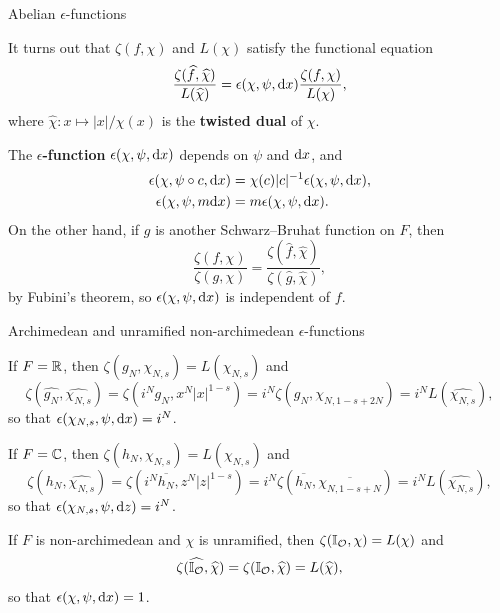 \begin{frame}{Abelian $ \epsilon $-functions}

It turns out that $ \zeta(f, \chi) $ and $ L(\chi) $ satisfy the functional equation
$$ \dfrac{\zeta(\widehat{f}, \widehat{\chi})}{L(\widehat{\chi})} = \epsilon(\chi, \psi, \mathrm{d} x)\dfrac{\zeta(f, \chi)}{L(\chi)}, $$
where $ \widehat{\chi} : x \mapsto |x| / \chi(x) $ is the \textbf{twisted dual} of $ \chi $.

\bigskip The \textbf{$ \epsilon $-function} $ \epsilon(\chi, \psi, \mathrm{d} x) $ depends on $ \psi $ and $ \mathrm{d} x $, and
\begin{align*}
\epsilon(\chi, \psi \circ c, \mathrm{d} x) & = \chi(c)|c|^{-1}\epsilon(\chi, \psi, \mathrm{d} x), \\
\epsilon(\chi, \psi, m\mathrm{d} x) & = m\epsilon(\chi, \psi, \mathrm{d} x).
\end{align*}
On the other hand, if $ g $ is another Schwarz--Bruhat function on $ F $, then
$$ \dfrac{\zeta(f, \chi)}{\zeta(g, \chi)} = \dfrac{\zeta(\widehat{f}, \widehat{\chi})}{\zeta(\widehat{g}, \widehat{\chi})}, $$
by Fubini's theorem, so $ \epsilon(\chi, \psi, \mathrm{d} x) $ is independent of $ f $.

\end{frame}

\begin{frame}{Archimedean and unramified non-archimedean $ \epsilon $-functions}

If $ F = \mathbb{R} $, then $ \zeta(g_N, \chi_{N, s}) = L(\chi_{N, s}) $ and
$$ \zeta(\widehat{g_N}, \widehat{\chi_{N, s}}) = \zeta(i^Ng_N, x^N|x|^{1 - s}) = i^N\zeta(g_N, \chi_{N, 1 - s + 2N}) = i^NL(\widehat{\chi_{N, s}}), $$
so that $ \epsilon(\chi_{N, s}, \psi, \mathrm{d} x) = i^N $.

\bigskip If $ F = \mathbb{C} $, then $ \zeta(h_N, \chi_{N, s}) = L(\chi_{N, s}) $ and
$$ \zeta(\widehat{h_N}, \widehat{\chi_{N, s}}) = \zeta(i^N\overline{h_N}, z^N|z|^{1 - s}) = i^N\zeta(\overline{h_N}, \overline{\chi_{N, 1 - s + N}}) = i^NL(\widehat{\chi_{N, s}}), $$
so that $ \epsilon(\chi_{N, s}, \psi, \mathrm{d} z) = i^N $.

\bigskip If $ F $ is non-archimedean and $ \chi $ is unramified, then $ \zeta(\mathbb{I}_{\mathcal{O}}, \chi) = L(\chi) $ and
$$ \zeta(\widehat{\mathbb{I}_{\mathcal{O}}}, \widehat{\chi}) = \zeta(\mathbb{I}_{\mathcal{O}}, \widehat{\chi}) = L(\widehat{\chi}), $$
so that $ \epsilon(\chi, \psi, \mathrm{d} x) = 1 $.

\end{frame}

